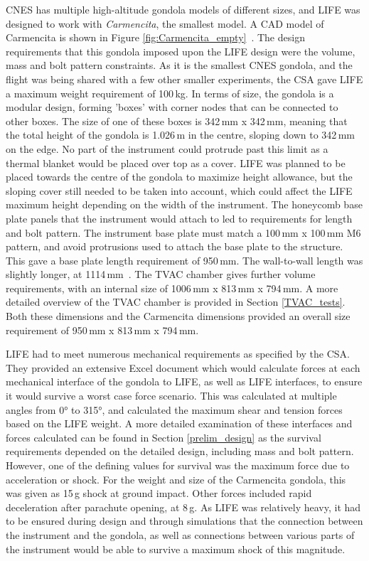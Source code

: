CNES has multiple high-altitude gondola models of different sizes, and LIFE was designed to work with \textit{Carmencita}, the smallest model. A CAD model of Carmencita is shown in Figure \ref{fig:Carmencita_empty}~\citep{STRATOS_CARMENCITA_doc}. The design requirements that this gondola imposed upon the LIFE design were the volume, mass and bolt pattern constraints. As it is the smallest CNES gondola, and the flight was being shared with a few other smaller experiments, the CSA gave LIFE a maximum weight requirement of 100\,kg. In terms of size, the gondola is a modular design, forming 'boxes' with corner nodes that can be connected to other boxes. The size of one of these boxes is 342\,mm x 342\,mm, meaning that the total height of the gondola is 1.026\,m in the centre, sloping down to 342\,mm on the edge. No part of the instrument could protrude past this limit as a thermal blanket would be placed over top as a cover. LIFE was planned to be placed towards the centre of the gondola to maximize height allowance, but the sloping cover still needed to be taken into account, which could affect the LIFE maximum height depending on the width of the instrument. The honeycomb base plate panels that the instrument would attach to led to requirements for length and bolt pattern. The instrument base plate must match a 100\,mm x 100\,mm M6 pattern, and avoid protrusions used to attach the base plate to the structure. This gave a base plate length requirement of 950\,mm. The wall-to-wall length was slightly longer, at 1114\,mm~\citep{STRATOS_CARMENCITA_doc}. The TVAC chamber gives further volume requirements, with an internal size of 1006\,mm x 813\,mm x 794\,mm. A more detailed overview of the TVAC chamber is provided in Section \ref{TVAC_tests}. Both these dimensions and the Carmencita dimensions provided an overall size requirement of 950\,mm x 813\,mm x 794\,mm. 

LIFE had to meet numerous mechanical requirements as specified by the CSA. They provided an extensive Excel document which would calculate forces at each mechanical interface of the gondola to LIFE, as well as LIFE interfaces, to ensure it would survive a worst case force scenario. This was calculated at multiple angles from 0° to 315°, and calculated the maximum shear and tension forces based on the LIFE weight. A more detailed examination of these interfaces and forces calculated can be found in Section \ref{prelim_design} as the survival requirements depended on the detailed design, including mass and bolt pattern. However, one of the defining values for survival was the maximum force due to acceleration or shock. For the weight and size of the Carmencita gondola, this was given as 15\,g shock at ground impact. Other forces included rapid deceleration after parachute opening, at 8\,g. As LIFE was relatively heavy, it had to be ensured during design and through simulations that the connection between the instrument and the gondola, as well as connections between various parts of the instrument would be able to survive a maximum shock of this magnitude.

